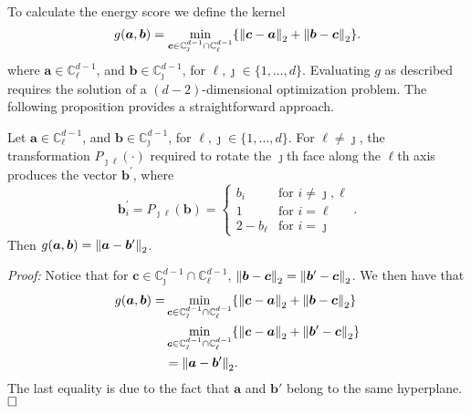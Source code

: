 To calculate the energy score we define the kernel 
    \[  
    g(\bm{a},\bm{b}) = \min_{\bm{c} \in{\mathbb C}_{\jmath}^{d-1}\cap{\mathbb C}_{\ell}^{d-1}}\left\{ 
        \pnorm{\bm{c}-\bm{a}}{2} + \pnorm{\bm{b}-\bm{c}}{2} \right\}.
    \]
    where $\bm{a} \in {\mathbb C}_{\ell}^{d-1}$, and 
    $\bm{b} \in {\mathbb   C}_{\jmath}^{d-1}$, for $\ell,\jmath\in \{1,\ldots, d\}$.
Evaluating $g$ as described requires the solution of a $(d-2)$-dimensional 
  optimization problem.  The following proposition provides a straightforward approach.
\begin{prop}\label{prop:rot}
    Let $\bm{a} \in {\mathbb C}_{\ell}^{d-1}$, and $\bm{b} \in {\mathbb C}_{\jmath}^{d-1}$, 
        for $\ell, \jmath \in \{1, \ldots , d\}$.  For $\ell\neq \jmath$, the 
  transformation $P_{\jmath\ell}(\cdot)$ required to rotate the $\jmath$th face along the 
  $\ell$th axis produces the vector $\bm{b}^\prime$, where
  \begin{equation}
    \label{eqn:rotation}
     \bm{b}^{\prime}_i = P_{\jmath\ell}(\bm{b}) = 
    \begin{cases}
        b_{i} &\text{for }i\neq \jmath,\ell\\
        1 &\text{for }i = \ell\\
        2 - b_{\ell} &\text{for }i = \jmath
    \end{cases}.
  \end{equation}
  Then $g(\bm{a},\bm{b}) = \pnorm{\bm{a} - \bm{b}^{\prime}}{2}$.
\end{prop}
{\em Proof:}
Notice that for 
  $\bm{c} \in {\mathbb C}_{\jmath}^{d-1}\cap{\mathbb C}_{\ell}^{d-1}$,
     $\pnorm{\bm{b} - \bm{c}}{2} =  \pnorm{\bm{b}^{\prime} - \bm{c}}{2}$. %
We then have that
  \begin{equation*}
    \begin{aligned}
    g(\bm{a},\bm{b}) = &\min_{\bm{c} \in{\mathbb C}_{\jmath}^{d-1}\cap{\mathbb C}_{\ell}^{d-1}}\left\{ 
        \pnorm{\bm{c}-\bm{a}}{2} + \pnorm{\bm{b}-\bm{c}}{2} \right\} \\
     &\min_{\bm{c} \in{\mathbb C}_{\jmath}^{d-1}\cap{\mathbb C}_{\ell}^{d-1}}\left\{ 
        \pnorm{\bm{c}-\bm{a}}{2} + \pnorm{\bm{b}^{\prime}-\bm{c}}{2} \right\}\\
    &= \pnorm{\bm{a} - \bm{b}^{\prime}}{2}.
    \end{aligned}
  \end{equation*}
  The last equality is due to the fact that $\bm{a}$ and $\bm{b}'$ belong to the 
  same hyperplane. $\hfill\Box$
    
